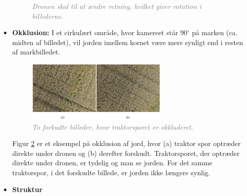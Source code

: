 \begin{itemize}
{\begin{figure}[H]
     \vspace{-1em}
    \begin{center} 
       \caption{\textcolor{gray}{\footnotesize \textit{Dronen skal til at ændre retning, hvilket giver rotation i billederne.}}}
    \label{fig:rotation}
     \end{center}
     \vspace{-2.5em}
  \end{figure} \noindent}
\item{\textbf{Okklusion:}
I et cirkulært område, hvor kamereet står 90$^{\circ}$ på marken (ca. midten af billedet), vil jorden imellem kornet være mere synligt end i resten af markbilledet.
\begin{figure}[H]
    \centering
    \includegraphics[width=0.65\textwidth]{fig/18.png}
     \vspace{-1em}
    \begin{center}    
       \caption{\textcolor{gray}{\footnotesize \textit{ To forkudte billeder, hvor traktorsporet er okkluderet. }}}
    \label{fig:okklusion}
     \end{center}
     \vspace{-2.5em}
  \end{figure} \noindent
Figur \ref{fig:okklusion} er et eksempel på okklusion af jord, hvor (a) traktor spor optræder direkte under dronen og (b) derefter forskudt. Traktorsporet, der optræder direkte under dronen, er tydelig og man se jorden. For det samme traktorspor, i det forskudte billede, er jorden ikke længere synlig.}
\item{\textbf{Struktur} }
\end{itemize}
